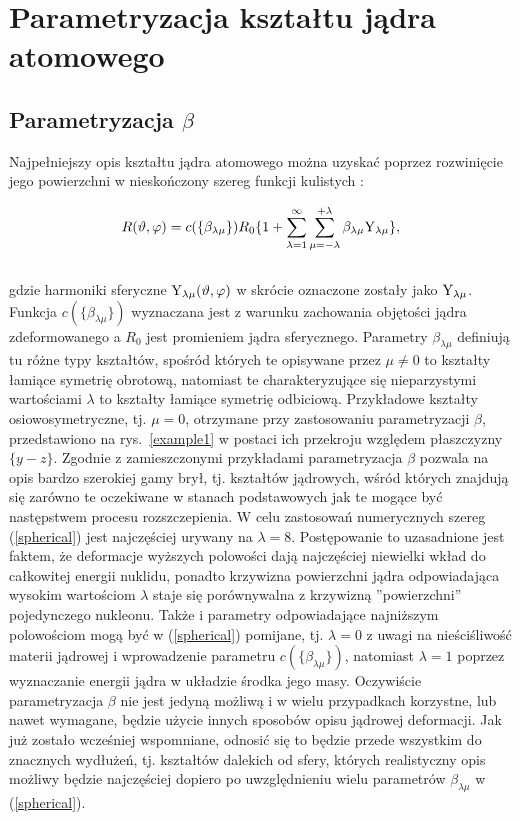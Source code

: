 \documentclass[a4paper,polish,twoside]{article}
\numberwithin{equation}{section}
\begin{document}
\clearpage
\section{Parametryzacja kształtu jądra atomowego}

\subsection{Parametryzacja $\beta$}

Najpełniejszy opis kształtu jądra atomowego można uzyskać poprzez rozwinięcie jego powierzchni w nieskończony szereg funkcji kulistych \cite{Pomorski} :

\begin{eqnarray} \label{spherical}
R(\vartheta ,\varphi)= c(\{\beta_{\lambda \mu} \})R_0\{ 
1+\sum_{\lambda=1}^{\infty} \sum_{\mu=-\lambda}^{+\lambda} \beta_{\lambda \mu} {\rm Y}_{\lambda \mu} \},
\end{eqnarray}
\\
gdzie harmoniki sferyczne ${\rm Y}_{\lambda \mu}(\vartheta ,\varphi)$ w skrócie oznaczone zostały jako ${\rm Y}_{\lambda \mu}$. Funkcja $c(\{\beta_{\lambda \mu} \})$ wyznaczana jest z warunku zachowania objętości jądra zdeformowanego a $R_0$ jest promieniem jądra sferycznego. Parametry $\beta_{\lambda \mu}$ definiują tu różne typy kształtów, spośród których te opisywane przez $\mu \neq 0$ to kształty łamiące symetrię obrotową, natomiast te charakteryzujące się nieparzystymi wartościami $\lambda$ to kształty łamiące symetrię odbiciową. Przykładowe kształty osiowosymetryczne, tj. $\mu = 0$, otrzymane przy zastosowaniu parametryzacji $\beta$, przedstawiono na rys.~\ref{example1} w postaci ich przekroju względem płaszczyzny $\{y-z\}$. Zgodnie z zamieszczonymi przykładami parametryzacja $\beta$ pozwala na opis bardzo szerokiej gamy brył, tj. kształtów jądrowych, wśród których znajdują się zarówno te oczekiwane w stanach podstawowych jak te mogące być następstwem procesu rozszczepienia. W celu zastosowań numerycznych szereg (\ref{spherical}) jest najczęściej urywany na $\lambda = 8$. Postępowanie to uzasadnione jest faktem, że deformacje wyższych polowości dają najczęściej niewielki wkład do całkowitej energii nuklidu, ponadto krzywizna powierzchni jądra  odpowiadająca wysokim wartościom $\lambda$ staje się porównywalna z krzywizną ''powierzchni'' pojedynczego nukleonu. Także i parametry odpowiadające najniższym polowościom mogą być w (\ref{spherical}) pomijane, tj. $\lambda = 0$ z uwagi na nieściśliwość materii jądrowej i wprowadzenie parametru $c(\{\beta_{\lambda \mu} \})$, natomiast $\lambda = 1$ poprzez wyznaczanie energii jądra w układzie środka jego masy. Oczywiście parametryzacja $\beta$ nie jest jedyną możliwą i w wielu przypadkach korzystne, lub nawet wymagane, będzie użycie innych sposobów opisu jądrowej deformacji. Jak już zostało wcześniej wspomniane, odnosić się to będzie przede wszystkim do znacznych wydłużeń, tj. kształtów dalekich od sfery, których realistyczny opis możliwy będzie najczęściej dopiero po uwzględnieniu wielu parametrów $\beta_{\lambda \mu}$ w (\ref{spherical}).
\end{document}
